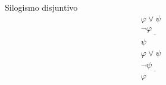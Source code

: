 \begin{ruleinf} \label{relinf_lorsylo} Silogismo disjuntivo
	\begin{equation}
	\begin{gathered}
		\varphi \lor \psi \\
		\underline {\lnot \varphi \quad \quad } \\
		\psi 
	\end{gathered}
	\end{equation}
	\begin{equation}
	\begin{gathered}
		\varphi \lor \psi \\
		\underline {\lnot \psi \quad \quad } \\
		\varphi
	\end{gathered}
\end{equation}
\end{ruleinf}

